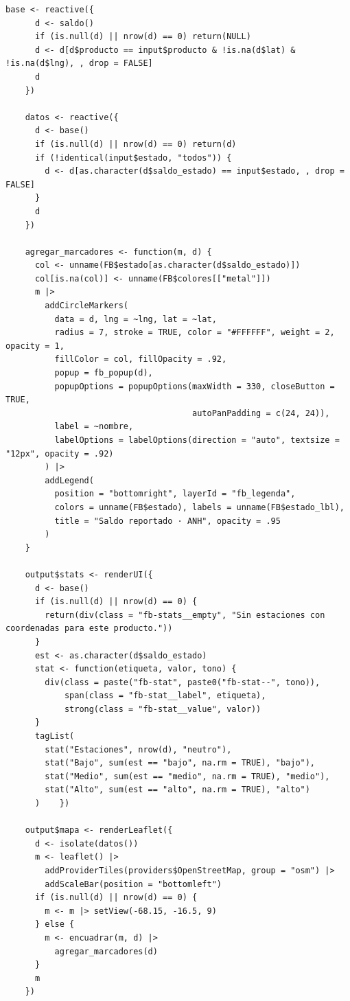 \begin{lstlisting}[style=anexoR]
    base <- reactive({
      d <- saldo()
      if (is.null(d) || nrow(d) == 0) return(NULL)
      d <- d[d$producto == input$producto & !is.na(d$lat) & !is.na(d$lng), , drop = FALSE]
      d
    })

    datos <- reactive({
      d <- base()
      if (is.null(d) || nrow(d) == 0) return(d)
      if (!identical(input$estado, "todos")) {
        d <- d[as.character(d$saldo_estado) == input$estado, , drop = FALSE]
      }
      d
    })

    agregar_marcadores <- function(m, d) {
      col <- unname(FB$estado[as.character(d$saldo_estado)])
      col[is.na(col)] <- unname(FB$colores[["metal"]])
      m |>
        addCircleMarkers(
          data = d, lng = ~lng, lat = ~lat,
          radius = 7, stroke = TRUE, color = "#FFFFFF", weight = 2, opacity = 1,
          fillColor = col, fillOpacity = .92,
          popup = fb_popup(d),
          popupOptions = popupOptions(maxWidth = 330, closeButton = TRUE,
                                      autoPanPadding = c(24, 24)),
          label = ~nombre,
          labelOptions = labelOptions(direction = "auto", textsize = "12px", opacity = .92)
        ) |>
        addLegend(
          position = "bottomright", layerId = "fb_legenda",
          colors = unname(FB$estado), labels = unname(FB$estado_lbl),
          title = "Saldo reportado · ANH", opacity = .95
        )
    }

    output$stats <- renderUI({
      d <- base()
      if (is.null(d) || nrow(d) == 0) {
        return(div(class = "fb-stats__empty", "Sin estaciones con coordenadas para este producto."))
      }
      est <- as.character(d$saldo_estado)
      stat <- function(etiqueta, valor, tono) {
        div(class = paste("fb-stat", paste0("fb-stat--", tono)),
            span(class = "fb-stat__label", etiqueta),
            strong(class = "fb-stat__value", valor))
      }
      tagList(
        stat("Estaciones", nrow(d), "neutro"),
        stat("Bajo", sum(est == "bajo", na.rm = TRUE), "bajo"),
        stat("Medio", sum(est == "medio", na.rm = TRUE), "medio"),
        stat("Alto", sum(est == "alto", na.rm = TRUE), "alto")
      )    })

    output$mapa <- renderLeaflet({
      d <- isolate(datos())
      m <- leaflet() |>
        addProviderTiles(providers$OpenStreetMap, group = "osm") |>
        addScaleBar(position = "bottomleft")
      if (is.null(d) || nrow(d) == 0) {
        m <- m |> setView(-68.15, -16.5, 9)
      } else {
        m <- encuadrar(m, d) |>
          agregar_marcadores(d)
      }
      m
    })


\end{lstlisting}
